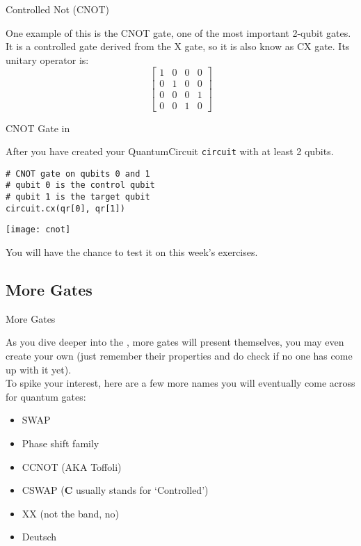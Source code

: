 \documentclass[aspectratio=43]{beamer}
\begin{document}
\begin{frame}{Controlled Not (CNOT)}
\begin{card}
    One example of this is the CNOT gate, one of the most important 2-qubit gates. It is a controlled gate derived from the X gate, so it is also know as CX gate. Its unitary operator is:
    \begin{equation*}
        \begin{bmatrix}1 & 0 & 0 & 0\\ 0 & 1 & 0 & 0\\ 0 & 0 & 0 & 1\\ 0 & 0 & 1 & 0\end{bmatrix}
    \end{equation*}
\end{card}
\pagenumber
\end{frame}

\begin{frame}[fragile]{CNOT Gate in \qk}
\begin{card}
    After you have created your QuantumCircuit \texttt{circuit} with at least 2 qubits. 
    \begin{verbatim}
# CNOT gate on qubits 0 and 1
# qubit 0 is the control qubit
# qubit 1 is the target qubit
circuit.cx(qr[0], qr[1])
    \end{verbatim}
    \begin{center}
        \texttt{[image: cnot]} 
    \end{center}
    You will have the chance to test it on this week's exercises.
\end{card}
\end{frame}


\subsection{More Gates} %
\begin{frame}{More Gates}
\begin{cardTiny}
    As you dive deeper into the \qw, more gates will present themselves, you may even create your own (just remember their properties and do check if no one has come up with it yet).\\
    To spike your interest, here are a few more names you will eventually come across for quantum gates:
    \begin{itemize}
        \item SWAP
        \item Phase shift family
        \item CCNOT (AKA Toffoli)
        \item CSWAP (\textbf{C} usually stands for `Controlled')
        \item XX (not the band, no)
        \item Deutsch
    \end{itemize}
\end{cardTiny}
\pagenumber
\end{frame}
\end{document}
